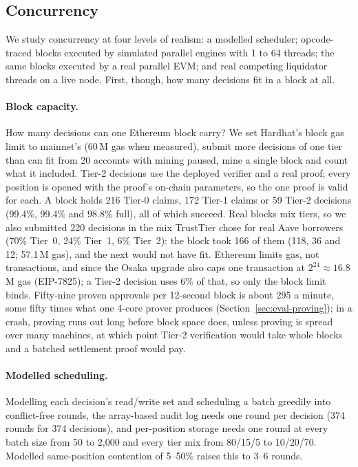 \documentclass[sigconf,nonacm]{acmart}
\begin{document}
\subsection{Concurrency}
\label{sec:eval-concurrency}

We study concurrency at four levels of realism: a modelled scheduler; opcode-traced blocks executed by simulated parallel engines with 1 to 64 threads; the same blocks executed by a real parallel EVM; and real competing liquidator threads on a live node. First, though, how many decisions fit in a block at all.

\paragraph{Block capacity.}
\label{sec:eval-capacity}
How many decisions can one Ethereum block carry? We set Hardhat's block gas limit to mainnet's (60\,M gas when measured), submit more decisions of one tier than can fit from 20 accounts with mining paused, mine a single block and count what it included. Tier-2 decisions use the deployed verifier and a real proof; every position is opened with the proof's on-chain parameters, so the one proof is valid for each. A block holds 216 Tier-0 claims, 172 Tier-1 claims or 59 Tier-2 decisions (99.4\%, 99.4\% and 98.8\% full), all of which succeed. Real blocks mix tiers, so we also submitted 220 decisions in the mix TrustTier chose for real Aave borrowers (70\% Tier~0, 24\% Tier~1, 6\% Tier~2): the block took 166 of them (118, 36 and 12; 57.1\,M gas), and the next would not have fit. Ethereum limits gas, not transactions, and since the Osaka upgrade also caps one transaction at $2^{24}\approx16.8$\,M gas (EIP-7825); a Tier-2 decision uses 6\% of that, so only the block limit binds. Fifty-nine proven approvals per 12-second block is about 295 a minute, some fifty times what one 4-core prover produces (Section~\ref{sec:eval-proving}); in a crash, proving runs out long before block space does, unless proving is spread over many machines, at which point Tier-2 verification would take whole blocks and a batched settlement proof would pay.

\paragraph{Modelled scheduling.} Modelling each decision's read/write set and scheduling a batch greedily into conflict-free rounds, the array-based audit log needs one round per decision (374 rounds for 374 decisions), and per-position storage needs one round at every batch size from 50 to 2,000 and every tier mix from 80/15/5 to 10/20/70. Modelled same-position contention of 5--50\% raises this to 3--6 rounds.
\end{document}
